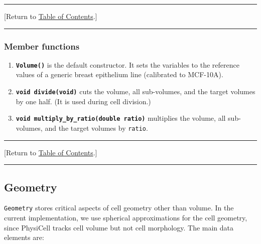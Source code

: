 \documentclass[12pt]{article}
\renewcommand{\v}{\verb}
\newcommand{\smallcode}[1]{\textbf{\texttt{#1}}}
\newcommand{\blue}[1]{\textcolor{blue}{#1}}
\newcommand{\DONE}{}%
\newcommand{\TOClink}{\begin{center}\hrule\vskip-5pt\phantom{.}\hfill[Return to \hyperlink{TOC}{Table of Contents}.]\hfill\phantom{.}\vskip3pt\hrule\end{center}}
\begin{document}
\TOClink

\subsubsection{Member functions}
\begin{enumerate}
\item 
\smallcode{Volume()} is the default constructor. It sets the variables to the reference values of 
a generic breast epithelium line (calibrated to MCF-10A).  

\item 
\smallcode{void divide(void)} cuts the volume, all sub-volumes, and the target volumes by one half. 
(It is used during cell division.) 

\item 
\smallcode{void multiply\_by\_ratio(double ratio)} multiplies the volume, all sub-volumes, and the target volumes by \v|ratio|. 

\end{enumerate}




\TOClink

\subsection{Geometry \DONE}
\label{sec:Geometry}
\v|Geometry| stores critical aspects of cell geometry other than volume. In the current 
implementation, we use spherical approximations for the cell geometry, since 
PhysiCell tracks cell volume but not cell morphology. The main data elements are: 
\end{document}
